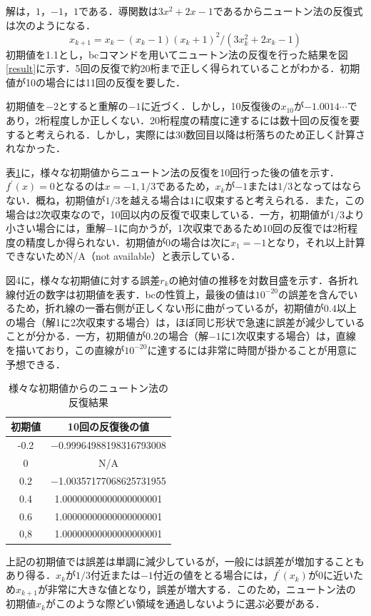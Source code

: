 \documentclass[a4j,11pt]{jarticle}
\begin{document}
解は，$1$，$-1$，$1$である．導関数は$3x^2+2x-1$であるからニュートン法の反復式は次のようになる．
\begin{equation}
x_{k+1}=x_k-(x_k-1)(x_k+1)^2/(3x^2_k+2x_k-1)
\label{newtonrepeat}
\end{equation}
初期値を1.1とし，bcコマンドを用いてニュートン法の反復を行った結果を図\ref{result}に示す．5回の反復で約20桁まで正しく得られていることがわかる．初期値が10の場合には11回の反復を要した．

初期値を$-2$とすると重解の$-1$に近づく．しかし，10反復後の$x_{10}$が$-1.0014\cdots$であり，2桁程度しか正しくない．20桁程度の精度に達するには数十回の反復を要すると考えられる．しかし，実際には30数回目以降は桁落ちのため正しく計算されなかった．

表\ref{table}に，様々な初期値からニュートン法の反復を10回行った後の値を示す．$f^\prime(x)=0$となるのは$x=-1,1/3$であるため，$x_k$が$-1$または$1/3$となってはならない．概ね，初期値が$1/3$を越える場合は$1$に収束すると考えられる．また，この場合は2次収束なので，10回以内の反復で収束している．一方，初期値が$1/3$より小さい場合には，重解$-1$に向かうが，1次収束であるため10回の反復では2桁程度の精度しか得られない．初期値が$0$の場合は次に$x_1=-1$となり，それ以上計算できないためN/A（not available）と表示している．

図4に，様々な初期値に対する誤差$r_k$の絶対値の推移を対数目盛を示す．各折れ線付近の数字は初期値を表す．bcの性質上，最後の値は$10^{-20}$の誤差を含んでいるため，折れ線の一番右側が正しくない形に曲がっているが，初期値が$0.4$以上の場合（解1に2次収束する場合）は，ほぼ同じ形状で急速に誤差が減少していることが分かる．一方，初期値が$0.2$の場合（解$-1$に1次収束する場合）は，直線を描いており，この直線が$10^{-20}$に達するには非常に時間が掛かることが用意に予想できる．
\begin{table}[t]
\center
\caption{様々な初期値からのニュートン法の反復結果}
\begin{tabular}{|c|c|}
\hline
初期値&10回の反復後の値\\
\hline
-0.2&−0.99964988198316793008\\
0&N/A\\
0.2&−1.00357177068625731955\\
0.4&1.00000000000000000001\\
0.6&1.00000000000000000001\\
0,8&1.00000000000000000001\\
\hline
\end{tabular}
\label{table}
\end{table}
上記の初期値では誤差は単調に減少しているが，一般には誤差が増加することもあり得る．$x_k$が$1/3$付近または$-1$付近の値をとる場合には，$f^\prime(x_k)$が0に近いため$x_{k+1}$が非常に大きな値となり，誤差が増大する．このため，ニュートン法の初期値$x_k$がこのような際どい領域を通過しないように選ぶ必要がある．
\end{document}
